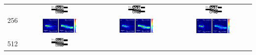 \begin{landscape}
\begin{table}[ht]
\begin{tabular}{|c|c|c|c|}
    \hline
      \multirow{2}{*}{256} &
      \includegraphics[width=0.24\textwidth]{image/results/wdm/GA/visualize_eps_cont_256.png} &
      \includegraphics[width=0.24\textwidth]{image/results/wdm/GA/visualize_eps_disc_256.png} &
      \includegraphics[width=0.24\textwidth]{image/results/wdm/GA/visualize_eps_fab_256.png} \\
      \cline{2-4}
      &
      \includegraphics[width=0.50\textwidth]{image/results/wdm/GA/visualize_field_cont_256.png} &
      \includegraphics[width=0.50\textwidth]{image/results/wdm/GA/visualize_field_disc_256.png} &
      \includegraphics[width=0.50\textwidth]{image/results/wdm/GA/visualize_field_fab_256.png} \\
    \hline
      \multirow{2}{*}{512} &
      \includegraphics[width=0.24\textwidth]{image/results/wdm/GA/visualize_eps_cont_512.png} &

\end{tabular}
\end{table}
\end{landscape}
